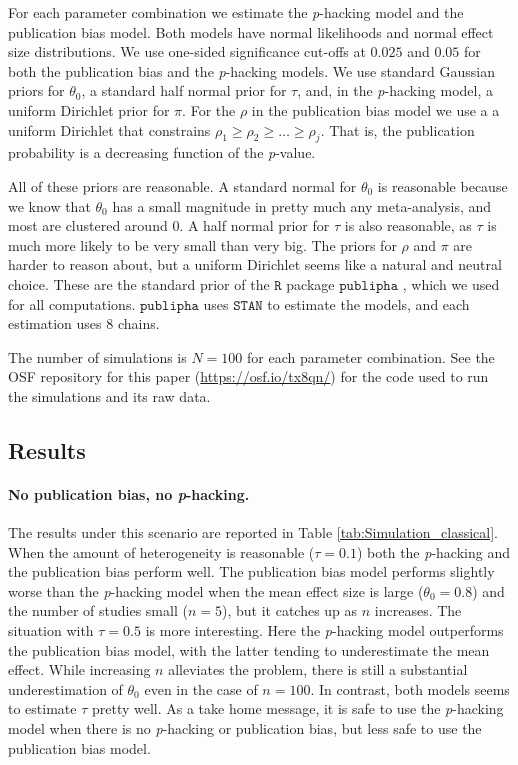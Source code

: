 \documentclass{article}
\theoremstyle{plain}
\theoremstyle{definition}
\begin{document}
For each parameter combination we estimate the \textit{p}-hacking model and the publication bias model. Both models have normal likelihoods and normal effect size distributions. We use one-sided significance cut-offs at $0.025$ and $0.05$ for both the publication bias and the \textit{p}-hacking models. We use standard Gaussian priors for $\theta_0$, a standard half normal prior for $\tau$, and, in the \textit{p}-hacking model, a uniform Dirichlet prior for $\pi$. For the $\rho$ in the publication bias model we use a a uniform Dirichlet that constrains $\rho_{1}\geq\rho_{2}\geq\ldots\geq\rho_{j}$. That is, the publication probability is a decreasing function of the \textit{p}-value.

All of these priors are reasonable. A standard normal for $\theta_0$ is reasonable because we know that $\theta_0$ has a small magnitude in pretty much any meta-analysis, and most are clustered around $0$. A half normal prior for $\tau$ is also reasonable, as $\tau$ is much more likely to be very small than very big. The priors for $\rho$ and $\pi$ are harder to reason about, but a uniform Dirichlet seems like a natural and neutral choice. These are the standard prior of the $\mathtt{R}$ package $\mathtt{publipha}$ \citep{publipha}, which we used for all computations. $\mathtt{publipha}$ uses $\mathtt{STAN}$ \citep{Carpenter2017-cf} to estimate the models, and each estimation uses $8$ chains.

The number of simulations is $N = 100$ for each parameter combination. See the OSF repository for this paper (\url{https://osf.io/tx8qn/}) for the code used to run the simulations and its raw data.

\subsection{Results}
\paragraph{No publication bias, no \textit{p}-hacking.} The results under this scenario are reported in Table \ref{tab:Simulation_classical}. When the amount of heterogeneity is reasonable ($\tau = 0.1$) both the \textit{p}-hacking and the publication bias perform well. The publication bias model performs slightly worse than the \textit{p}-hacking model when the mean effect size is large ($\theta_0 = 0.8$) and the number of studies small ($n=5$), but it catches up as $n$ increases. The situation with $\tau = 0.5$ is more interesting. Here the \textit{p}-hacking model outperforms the publication bias model, with the latter tending to underestimate the mean effect. While increasing $n$ alleviates the problem, there is still a substantial underestimation of $\theta_0$ even in the case of $n = 100$. In contrast, both models seems to estimate $\tau$ pretty well. As a take home message, it is safe to use the \textit{p}-hacking model when there is no \textit{p}-hacking or publication bias, but less safe to use the publication bias model.
\end{document}
